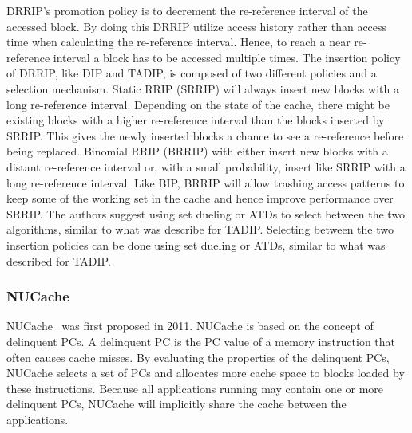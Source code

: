 DRRIP's promotion policy is to decrement the re-reference interval of the accessed block.
By doing this DRRIP utilize access history rather than access time when calculating the re-reference interval.
Hence, to reach a near re-reference interval a block has to be accessed multiple times.
The insertion policy of DRRIP, like DIP and TADIP, is composed of two different policies and a selection mechanism.
Static RRIP (SRRIP) will always insert new blocks with a long re-reference interval. 
Depending on the state of the cache, there might be existing blocks with a higher re-reference interval than the blocks inserted by SRRIP.
This gives the newly inserted blocks a chance to see a re-reference before being replaced.
Binomial RRIP (BRRIP) with either insert new blocks with a distant re-reference interval or, with a small probability, insert like SRRIP with a long re-reference interval.
Like BIP, BRRIP will allow trashing access patterns to keep some of the working set in the cache and hence improve performance over SRRIP.
The authors suggest using set dueling or ATDs to select between the two algorithms, similar to what was describe for TADIP.
Selecting between the two insertion policies can be done using set dueling or ATDs, similar to what was described for TADIP.

\subsubsection{NUCache}

NUCache~\cite{Manikantan2011} was first proposed in 2011.
NUCache is based on the concept of delinquent PCs.
A delinquent PC is the PC value of a memory instruction that often causes cache misses.
By evaluating the properties of the delinquent PCs, NUCache selects a set of PCs and allocates more cache space to blocks loaded by these instructions.
Because all applications running may contain one or more delinquent PCs, NUCache will implicitly share the cache between the applications.

